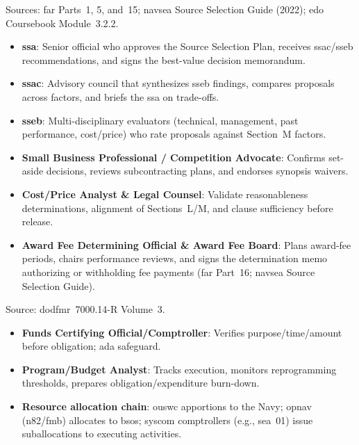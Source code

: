 \documentclass[../main.tex]{subfiles}
\begin{document}
\begin{description}[style=nextline, labelsep=0.5em, font=\bfseries]
  \item[\textbf{Source selection governance.}]
        Sources: \ac{far} Parts~1, 5, and~15; \ac{navsea} Source Selection Guide (2022); \ac{edo} Coursebook Module~3.2.2.
        \begin{itemize}
          \item \textbf{\ac{ssa}}: Senior official who approves the Source Selection Plan, receives \ac{ssac}/\ac{sseb} recommendations, and signs the best-value decision memorandum.
          \item \textbf{\ac{ssac}}: Advisory council that synthesizes \ac{sseb} findings, compares proposals across factors, and briefs the \ac{ssa} on trade-offs.
          \item \textbf{\ac{sseb}}: Multi-disciplinary evaluators (technical, management, past performance, cost/price) who rate proposals against Section~M factors.
          \item \textbf{Small Business Professional / Competition Advocate}: Confirms set-aside decisions, reviews subcontracting plans, and endorses synopsis waivers.
          \item \textbf{Cost/Price Analyst \& Legal Counsel}: Validate reasonableness determinations, alignment of Sections~L/M, and clause sufficiency before release.
          \item \textbf{Award Fee Determining Official \& Award Fee Board}: Plans award-fee periods, chairs performance reviews, and signs the determination memo authorizing or withholding fee payments (\ac{far} Part~16; \ac{navsea} Source Selection Guide).
        \end{itemize}

  \item[\textbf{Fiscal control \& certification.}]
        Source: \ac{dodfmr}~7000.14-R Volume~3.
        \begin{itemize}
          \item \textbf{Funds Certifying Official/Comptroller}: Verifies purpose/time/amount before obligation; \ac{ada} safeguard.
          \item \textbf{Program/Budget Analyst}: Tracks execution, monitors reprogramming thresholds, prepares obligation/expenditure burn-down.
          \item \textbf{Resource allocation chain}: \ac{ouswc} apportions to the Navy; \ac{opnav} (\ac{n82}/\ac{fmb}) allocates to \acp{bso}; \ac{syscom} comptrollers (e.g., \ac{sea}~01) issue suballocations to executing activities.
        \end{itemize}


\end{description}
\end{document}
